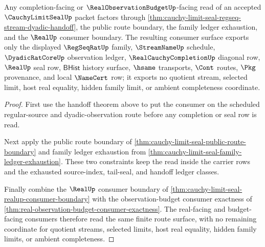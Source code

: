 \begin{theorem}
\label{thm:cauchy-limit-seal-completion-budget-factorization}
Any completion-facing or $\RealObservationBudgetUp$-facing read of an accepted $\CauchyLimitSealUp$ packet factors through \autoref{thm:cauchy-limit-seal-regseq-stream-dyadic-handoff}, the public route boundary, the family ledger exhaustion, and the $\RealUp$ consumer boundary. The resulting consumer surface exports only the displayed $\RegSeqRatUp$ family, $\StreamNameUp$ schedule, $\DyadicRatCoreUp$ observation ledger, $\RealCauchyCompletionUp$ diagonal row, $\RealUp$ seal row, $\mathsf{BHist}$ history surface, $\hsame$ transports, $\Cont$ routes, $\Pkg$ provenance, and local $\NameCert$ row; it exports no quotient stream, selected limit, host real equality, hidden family limit, or ambient completeness coordinate.
\end{theorem}
\begin{proof}
First use the handoff theorem above to put the consumer on the scheduled regular-source and dyadic-observation route before any completion or seal row is read.

Next apply the public route boundary of \autoref{thm:cauchy-limit-seal-public-route-boundary} and family ledger exhaustion from \autoref{thm:cauchy-limit-seal-family-ledger-exhaustion}. These two constraints keep the read inside the carrier rows and the exhausted source-index, tail-seal, and handoff ledger classes.

Finally combine the $\RealUp$ consumer boundary of \autoref{thm:cauchy-limit-seal-realup-consumer-boundary} with the observation-budget consumer exactness of \autoref{thm:real-observation-budget-consumer-exactness}. The real-facing and budget-facing consumers therefore read the same finite route surface, with no remaining coordinate for quotient streams, selected limits, host real equality, hidden family limits, or ambient completeness.
\end{proof}

